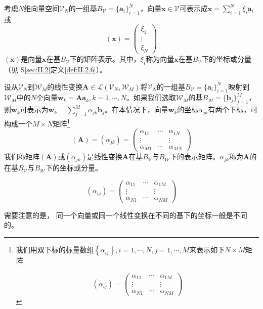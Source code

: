 \documentclass[main.tex]{subfiles}
\begin{document}
考虑$N$维向量空间$\mathcal{V}_N$的一组基$B_\mathcal{V}=\{\mathbf{a}_i\}_{i=1}^N$，向量$\mathbf{x}\in\mathcal{V}$可表示成$\mathbf{x}=\sum_{i=1}^N\xi_i\mathbf{a}_i$或
\[\left(\mathbf{x}\right)=\left(\begin{array}{ccc}\xi_1\\\vdots\\\xi_N\end{array}\right)\]
$\left(\mathbf{x}\right)$是向量$\mathbf{x}$在基$B_\mathcal{V}$下的矩阵表示。其中，$\xi_i$称为向量$\mathbf{x}$在基$B_\mathcal{V}$下的坐标或分量（见
S\ref{sec:II.2}定义\ref{def:II.2.6}）。

设从$\mathcal{V}_N$到$\mathcal{W}_M$的线性变换$\mathbf{A}\in\mathcal{L}\left(\mathcal{V}_N,\mathcal{W}_M\right)$将$\mathcal{V}_N$的一组基$B_\mathcal{V}=\{\mathbf{a}_i\}_{i=1}^N$映射到$\mathcal{W}_M$中的$N$个向量$\mathbf{w}_k=\mathbf{Aa}_k,k=1,\cdots,N$。如果我们选取$\mathcal{W}_M$的基$B_\mathcal{W}=\{\mathbf{b}_j\}_{j=1}^M$，则$\mathbf{w}_k$可表示为$\mathbf{w}_k=\sum_{j=1}^M\alpha_{jk}\mathbf{b}_j$。在本情况下，向量$\mathbf{w}_k$的坐标$\alpha_{jk}$有两个下标，可构成一个$M\times N$矩阵\footnote{我们用双下标的标量数组$\left\{\alpha_{ij}\right\},i=1,\cdots,N,j=1,\cdots,M$来表示如下$N\times M$矩阵

\[\left(\alpha_{ij}\right)=\left(\begin{array}{ccc}\alpha_{11}&\cdots&\alpha_{1M}\\\vdots&&\vdots\\\alpha_{N1}&\cdots&\alpha_{NM}\end{array}\right)\]}
\[\left(\mathbf{A}\right)=\left(\alpha_{jk}\right)=\left(\begin{array}{ccc}\alpha_{11}&\cdots&\alpha_{1N}\\\vdots&&\vdots\\\alpha_{M1}&\cdots&\alpha_{MN}\end{array}\right)\]
我们称矩阵$\left(\mathbf{A}\right)$或$\left(\alpha_{jk}\right)$是线性变换$\mathbf{A}$在基$B_\mathcal{V}$与$B_\mathcal{W}$下的表示矩阵。$\alpha_{jk}$称为$\mathbf{A}$的在基$B_\mathcal{V}$与$B_\mathcal{W}$下的坐标或分量。

\[\left(\alpha_{ij}\right)=\left(\begin{array}{ccc}\alpha_{11}&\cdots&\alpha_{1M}\\\vdots&&\vdots\\\alpha_{N1}&\cdots&\alpha_{NM}\end{array}\right)\]

需要注意的是， 同一个向量或同一个线性变换在不同的基下的坐标一般是不同的。
\end{document}
